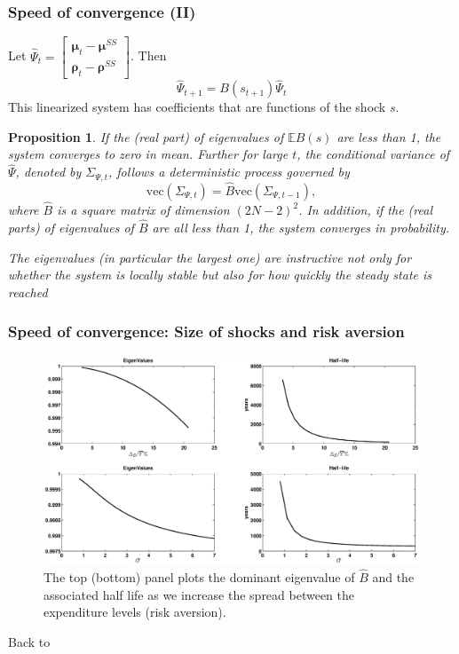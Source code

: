 \documentclass{beamer}
\newcommand{\bmat}{\begin{matrix}}
\newcommand{\emat}{\end{matrix}}
\newtheorem{proposition}{Proposition}
\begin{document}
\begin{frame}
\frametitle{Speed of convergence  (II) }
Let $\hat{\Psi}_{t}= \left[\bmat \bm{\mu}_{t} - \bm{\mu}^{SS}\\ \bm \rho_t - \bm \rho^{SS}\emat\right]$. Then
\begin{equation*}
 \hat{\Psi}_{t+1}=B(s_{t+1})\hat{\Psi}_t
\end{equation*}
This linearized system has coefficients that are functions of the shock $s$.
\small

\begin{proposition}\label{prop: localstability}
If the (real part) of eigenvalues of $\mathbb{E}B(s)$ are less than 1,  the system  converges to zero  in mean. Further for large $t$, the conditional variance of $\hat{\Psi}$, denoted by $\Sigma_{\Psi,t}$, follows a deterministic process governed by
\[\text{vec}(\Sigma_{\Psi,t})=\hat{B} \text{vec}(\Sigma_{\Psi,t-1}),\]	
where $\hat{B}$ is a square matrix of dimension $(2N-2)^2$. In addition,  if the (real parts) of eigenvalues of $\hat{B}$ are all less than 1, the system converges in probability.
\end{proposition}

\color{red}\emph{The eigenvalues (in particular the largest one) are instructive not only for whether the system is locally stable but also for how quickly the steady state is reached}

\end{frame}

\begin{frame}
\frametitle{Speed of convergence: Size of shocks and risk aversion}

  \begin{figure}[htp]
  \tiny
 \centering
 \includegraphics[width=\textwidth]{Draft25Graphs/eigenvalues.eps}
 \caption{\tiny{The top (bottom) panel plots the dominant eigenvalue of $\hat{B}$ and the associated half life as we increase
the spread between the expenditure levels (risk aversion).}}
 \label{fig: Eigenvalues}
 \end{figure}
 Back to \hyperlink{main}{}
 \end{frame}
\end{document}
